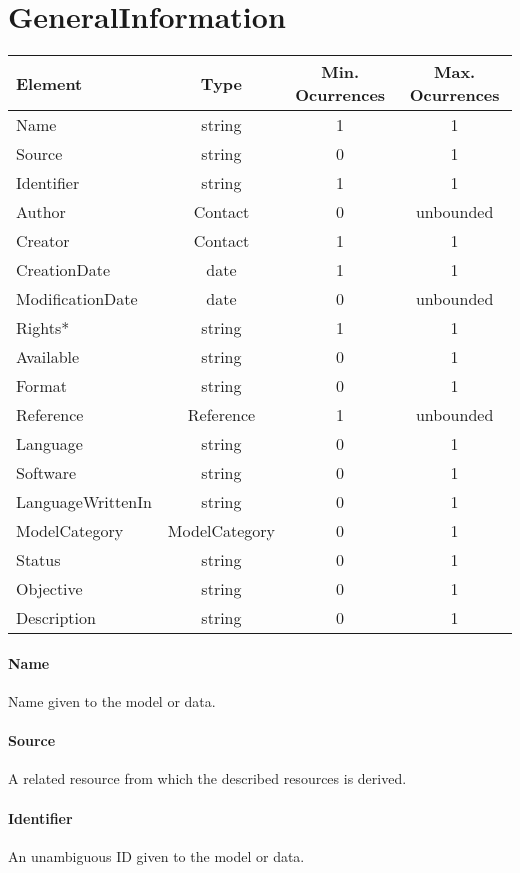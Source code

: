 \documentclass[a4paper]{report}
\begin{document}
\section{GeneralInformation}

\begin{tabular}{|l|c|c|c|}
    \hline
    \textbf{Element} & \textbf{Type} & \textbf{Min. Ocurrences} & \textbf{Max. Ocurrences} \\
    \hline
    Name & string & 1 & 1 \\
    Source & string & 0 & 1\\
    Identifier & string & 1 & 1 \\
    Author & Contact & 0 & unbounded \\
    Creator & Contact & 1 & 1 \\
    CreationDate & date & 1 & 1 \\
    ModificationDate & date & 0 & unbounded \\
    Rights* & string & 1 & 1 \\
    Available & string & 0 & 1 \\
    Format & string & 0 & 1 \\
    Reference & Reference & 1 & unbounded \\
    Language & string & 0 & 1 \\
    Software & string & 0 & 1 \\
    LanguageWrittenIn & string & 0 & 1 \\
    ModelCategory & ModelCategory & 0 & 1 \\
    Status & string & 0 & 1 \\
    Objective & string & 0 & 1 \\
    Description & string & 0 & 1 \\
    \hline
\end{tabular}

\paragraph{Name}
Name given to the model or data.

\paragraph{Source}
A related resource from which the described resources is derived.

\paragraph{Identifier}
An unambiguous ID given to the model or data.
\end{document}

